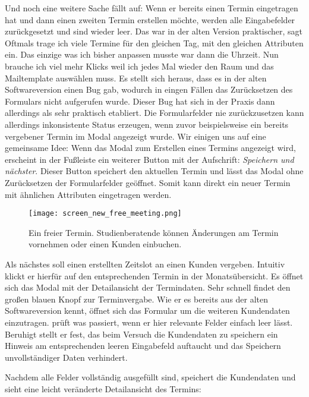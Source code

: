 Und noch eine weitere Sache fällt \ipName auf: Wenn er bereits einen Termin
eingetragen hat und dann einen zweiten Termin erstellen möchte, werden alle
Eingabefelder zurückgesetzt und sind wieder leer. \glqq{}Das war in der alten
Version praktischer\grqq{}, sagt \ipName \glqq{}Oftmals trage ich viele Termine
für den gleichen Tag, mit den gleichen Attributen ein. Das einzige was ich
bisher anpassen musste war dann die Uhrzeit. Nun brauche ich viel mehr Klicks
weil ich jedes Mal wieder den Raum und das Mailtemplate auswählen
muss.\grqq{}\cite{clavesUsertest} Es stellt sich heraus, dass es in der alten
Softwareversion einen Bug gab, wodurch in eingen Fällen das Zurücksetzen des
Formulars nicht aufgerufen wurde. Dieser Bug hat sich in der Praxis dann
allerdings als sehr praktisch etabliert. Die Formularfelder nie zurückzusetzen
kann allerdings inkonsistente Status erzeugen, wenn zuvor beispielsweise ein
bereits vergebener Termin im Modal angezeigt wurde. Wir einigen uns auf eine
gemeinsame Idee: Wenn das Modal zum Erstellen eines Termins angezeigt wird,
erscheint in der Fußleiste ein weiterer Button mit der Aufschrift:
\textit{Speichern und nächster}. Dieser Button speichert den aktuellen Termin
und lässt das Modal ohne Zurücksetzen der Formularfelder geöffnet. Somit kann
direkt ein neuer Termin mit ähnlichen Attributen eingetragen werden.

\begin{figure}[H]
    \caption{Ein freier Termin. Studienberatende können Änderungen am Termin vornehmen oder einen Kunden einbuchen.}
    \centering
    \texttt{[image: screen\_new\_free\_meeting.png]}
\end{figure}

Als nächstes soll \ipName einen erstellten Zeitslot an einen Kunden vergeben.
Intuitiv klickt er hierfür auf den entsprechenden Termin in der
Monatsübersicht. Es öffnet sich das Modal mit der Detailansicht der
Termindaten. Sehr schnell findet \ipName den großen blauen Knopf zur
Terminvergabe. Wie er es bereits aus der alten Softwareversion kennt, öffnet
sich das Formular um die weiteren Kundendaten einzutragen. \ipName prüft was
passiert, wenn er hier relevante Felder einfach leer lässt. Beruhigt stellt er
fest, das beim Versuch die Kundendaten zu speichern ein Hinweis am
entsprechenden leeren Eingabefeld auftaucht und das Speichern unvollständiger
Daten verhindert.

Nachdem alle Felder vollständig ausgefüllt sind, speichert \ipName die
Kundendaten und sieht eine leicht veränderte Detailansicht des Termins:

